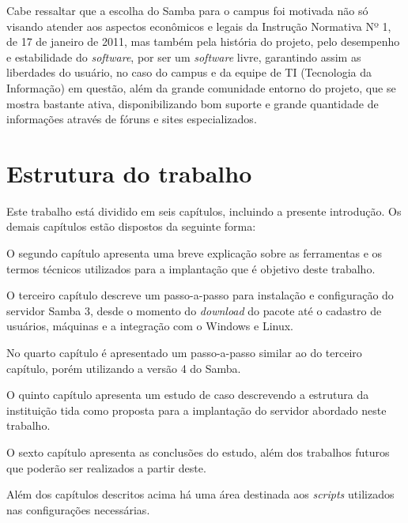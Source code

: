 Cabe ressaltar que a escolha do Samba para o campus foi motivada não só visando atender aos aspectos econômicos e legais da Instrução Normativa Nº 1, de 17 de janeiro de 2011, mas também pela história do projeto, pelo desempenho e estabilidade do \textit{software}, por ser um \textit{software} livre, garantindo assim as liberdades do usuário, no caso do campus e da equipe de TI (Tecnologia da Informação) em questão, além da grande comunidade entorno do projeto, que se mostra bastante ativa, disponibilizando bom suporte e grande quantidade de informações através de fóruns e sites especializados.

\section{Estrutura do trabalho}

Este trabalho está dividido em seis capítulos, incluindo a presente introdução. Os demais capítulos estão dispostos da seguinte forma:

O segundo capítulo apresenta uma breve explicação sobre as ferramentas e os termos técnicos utilizados para a implantação que é objetivo deste trabalho. 

O terceiro capítulo descreve um passo-a-passo para instalação e configuração do servidor Samba 3, desde o momento do \textit{download} do pacote até o cadastro de usuários, máquinas e a integração com o Windows e Linux.

No quarto capítulo é apresentado um passo-a-passo similar ao do terceiro capítulo, porém utilizando a versão 4 do Samba.

O quinto capítulo apresenta um estudo de caso descrevendo a estrutura da instituição tida como proposta para a implantação do servidor abordado neste trabalho.

O sexto capítulo apresenta as conclusões do estudo, além dos trabalhos futuros que poderão ser realizados a partir deste.

Além dos capítulos descritos acima há uma área destinada aos \textit{scripts} utilizados nas configurações necessárias.
